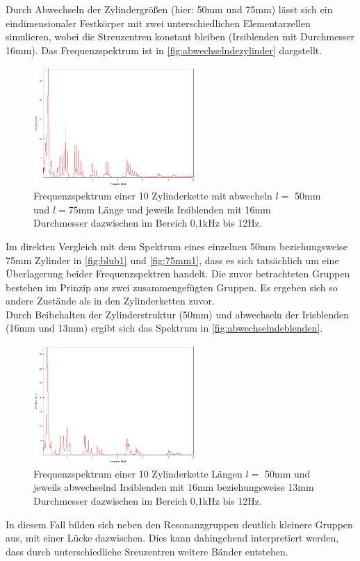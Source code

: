 Durch Abwechseln der Zylindergrößen (hier: 50\;mm und 75\;mm) lässt sich ein eindimensionaler
Festkörper mit zwei unterschiedlichen Elementarzellen simulieren, wobei die Streuzentren konstant
bleiben (Irsiblenden mit Durchmesser 16\;mm). Das Frequenzspektrum ist in \autoref{fig:abwechselndezylinder}
dargstellt.
\begin{figure}
    \centering
        \centering
        \includegraphics[width=0.55\textwidth]{data/4_4/abwechselnd.png}
    \caption{Frequenzspektrum einer 10 Zylinderkette mit abwecheln $l = $ 50\;mm und $l = 75$\;mm Länge und jeweils Irsiblenden mit 16\;mm Durchmesser dazwischen im Bereich 0,1\;kHz bis 12\;Hz.}
    \label{fig:abwechselndezylinder}
\end{figure}
Im direkten Vergleich mit dem Spektrum eines einzelnen 50\;mm beziehungsweise 75\;mm Zylinder in 
\autoref{fig:blub1} und \autoref{fig:75mm1}, dass es sich tatsächlich um eine Überlagerung 
beider Frequenzspektren handelt. Die zuvor betrachteten Gruppen bestehen im Prinzip aus 
zwei zusammengefügten Gruppen. Es ergeben sich so andere Zustände als in den Zylinderketten zuvor.\\
Durch Beibehalten der Zylinderstruktur (50\:mm) und abwechseln der Irisblenden (16\;mm und 13\;mm)
ergibt sich das Spektrum in \autoref{fig:abwechselndeblenden}.
\begin{figure}
    \centering
        \centering
        \includegraphics[width=0.55\textwidth]{data/4_5/abwechselndeblende.png}
    \caption{Frequenzspektrum einer 10 Zylinderkette Längen $l = $ 50\;mm und jeweils abwechselnd Irsiblenden mit 16\;mm beziehungsweise 13\;mm Durchmesser dazwischen im Bereich 0,1\;kHz bis 12\;Hz.}
    \label{fig:abwechselndeblenden}
\end{figure}
In diesem Fall bilden sich neben den Resonanzgruppen deutlich kleinere Gruppen aus, mit einer Lücke 
dazwischen. Dies kann dahingehend interpretiert werden, dass durch unterschiedliche Sreuzentren
weitere Bänder entstehen.